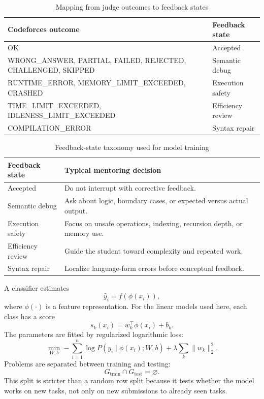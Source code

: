 \documentclass[conference]{IEEEtran}
\begin{document}
\begin{table}[t]
\caption{Mapping from judge outcomes to feedback states}
\label{tab:outcomemap}
\centering
\footnotesize
\setlength{\tabcolsep}{4pt}
\renewcommand{\arraystretch}{1.12}
\begin{tabular}{>{\ttfamily\raggedright\arraybackslash}p{4.1cm}p{2.25cm}}
\toprule
\textbf{Codeforces outcome} & \textbf{Feedback state} \\
\midrule
OK & Accepted \\
WRONG\_ANSWER, PARTIAL, FAILED, REJECTED, CHALLENGED, SKIPPED & Semantic debug \\
RUNTIME\_ERROR, MEMORY\_LIMIT\_EXCEEDED, CRASHED & Execution safety \\
TIME\_LIMIT\_EXCEEDED, IDLENESS\_LIMIT\_EXCEEDED & Efficiency review \\
COMPILATION\_ERROR & Syntax repair \\
\bottomrule
\end{tabular}
\end{table}

\begin{table}[t]
\caption{Feedback-state taxonomy used for model training}
\label{tab:taxonomy}
\centering
\renewcommand{\arraystretch}{1.12}
\begin{tabular}{p{2.5cm}p{4.7cm}}
\toprule
\textbf{Feedback state} & \textbf{Typical mentoring decision} \\
\midrule
Accepted & Do not interrupt with corrective feedback. \\
Semantic debug & Ask about logic, boundary cases, or expected versus actual output. \\
Execution safety & Focus on unsafe operations, indexing, recursion depth, or memory use. \\
Efficiency review & Guide the student toward complexity and repeated work. \\
Syntax repair & Localize language-form errors before conceptual feedback. \\
\bottomrule
\end{tabular}
\end{table}

A classifier estimates
\[
\hat{y}_i=f(\phi(x_i)),
\]
where $\phi(\cdot)$ is a feature representation. For the linear models used here, each class has a score
\[
s_k(x_i)=w_k^\top \phi(x_i)+b_k.
\]
The parameters are fitted by regularized logarithmic loss:
\[
\min_{W,b}-\sum_{i=1}^{n}\log P(y_i\mid \phi(x_i);W,b)
+\lambda\sum_{k}\|w_k\|_2^2.
\]
Problems are separated between training and testing:
\[
G_{\mathrm{train}}\cap G_{\mathrm{test}}=\varnothing.
\]
This split is stricter than a random row split because it tests whether the model works on new tasks, not only on new submissions to already seen tasks.
\end{document}
